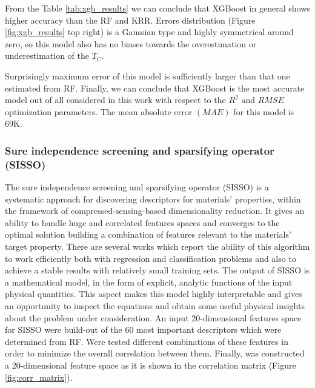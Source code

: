 From the Table \ref{tab:xgb_results} we can conclude that XGBoost in general shows higher accuracy than the RF and KRR. Errors distribution (Figure \ref{fig:xgb_results} top right) is a Gaussian type and highly symmetrical around zero, so this model also has no biases towards the overestimation or underestimation of the $T_C$.

Surprisingly maximum error of this model is sufficiently larger than that one estimated from RF.
Finally, we can conclude that XGBoost is the most accurate model out of all considered in this work with respect to the $R^2$ and $RMSE$ optimization parameters. The mean absolute error $(MAE)$ for this model is 69K.

\subsubsection{Sure independence screening and sparsifying operator (SISSO)}

The sure independence screening and sparsifying operator (SISSO) is a systematic approach for discovering descriptors for materials’ properties, within the framework of compressed-sensing-based dimensionality reduction.
It gives an ability to handle huge and correlated features spaces and converges to the optimal solution building a combination of features relevant to the materials' target property. There are several works \cite{Ouyang_2018,  Ouyang_2019, Ghiringhelli_2015} which report the ability of this algorithm to work efficiently both with regression and classification problems and also to achieve a stable results with relatively small training sets. The output of SISSO is a mathematical model, in the form of explicit, analytic functions of the input physical quantities. This aspect makes this model highly interpretable and gives an opportunity to inspect the equations and obtain some useful physical insights about the problem under consideration.
An input 20-dimensional features space for SISSO were build-out of the 60 most important descriptors which were determined from RF. Were tested different combinations of these features in order to minimize the overall correlation between them. Finally, was constructed a 20-dimensional feature space as it is shown in the correlation matrix (Figure \ref{fig:corr_matrix}).


